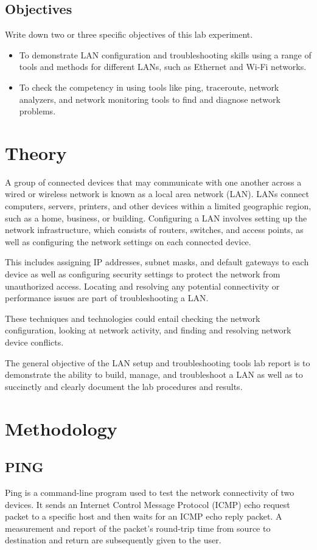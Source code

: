 \documentclass[11pt]{article}
\begin{document}
\subsection{Objectives}
Write down two or three specific objectives of this lab experiment.
\begin{itemize}
	\item To demonstrate LAN configuration and troubleshooting skills using a range of tools and methods for different LANs, such as Ethernet and Wi-Fi networks.
	\item To check the competency in using tools like ping, traceroute, network analyzers, and network monitoring tools to find and diagnose network problems.

\end{itemize}
\section{Theory}
A group of connected devices that may communicate with one another across a wired or wireless network is known as a local area network (LAN). LANs connect computers, servers, printers, and other devices within a limited geographic region, such as a home, business, or building. Configuring a LAN involves setting up the network infrastructure, which consists of routers, switches, and access points, as well as configuring the network settings on each connected device.

This includes assigning IP addresses, subnet masks, and default gateways to each device as well as configuring security settings to protect the network from unauthorized access. Locating and resolving any potential connectivity or performance issues are part of troubleshooting a LAN.

These techniques and technologies could entail checking the network configuration, looking at network activity, and finding and resolving network device conflicts.

The general objective of the LAN setup and troubleshooting tools lab report is to demonstrate the ability to build, manage, and troubleshoot a LAN as well as to succinctly and clearly document the lab procedures and results.




\section{Methodology}

\subsection{PING}
Ping is a command-line program used to test the network connectivity of two devices. It sends an Internet Control Message Protocol (ICMP) echo request packet to a specific host and then waits for an ICMP echo reply packet. A measurement and report of the packet's round-trip time from source to destination and return are subsequently given to the user.
\end{document}
